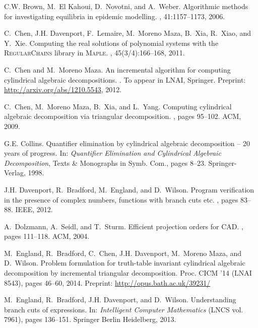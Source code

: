 \documentclass[runningheads,a4paper]{llncs}
\begin{document}
\begin{thebibliography}{99}
C.W. Brown, M.~El Kahoui, D.~Novotni, and A.~Weber.
\newblock Algorithmic methods for investigating equilibria in epidemic
  modelling.
, 41:1157--1173, 2006.

C.~Chen, J.H. Davenport, F.~Lemaire, M.~Moreno Maza, B.~Xia, R.~Xiao, and
  Y.~Xie.
\newblock Computing the real solutions of polynomial systems with the
  \textsc{RegularChains} library in \textsc{Maple}.
, 45(3/4):166--168, 2011.

C.~Chen and M.~Moreno Maza.
\newblock An incremental algorithm for computing cylindrical algebraic
  decompositions.
. To appear in LNAI, Springer. Preprint: \url{http://arxiv.org/abs/1210.5543}, 2012.

C.~Chen, M.~Moreno Maza, B.~Xia, and L.~Yang.
\newblock Computing cylindrical algebraic decomposition via triangular
  decomposition.
, pages 95--102. ACM, 2009.

G.E. Collins.
\newblock Quantifier elimination by cylindrical algebraic decomposition -- 20
  years of progress.
\newblock In: {\em Quantifier Elimination and Cylindrical Algebraic Decomposition}, Texts \& Monographs in Symb.
  Com., pages 8--23. Springer-Verlag, 1998.

J.H. Davenport, R.~Bradford, M.~England, and D.~Wilson.
\newblock Program verification in the presence of complex numbers, functions
  with branch cuts etc.
, pages 83--88. IEEE, 2012.

A.~Dolzmann, A.~Seidl, and T.~Sturm.
\newblock Efficient projection orders for {CAD}.
, pages 111--118. ACM, 2004.

M.~England, R.~Bradford, C.~Chen, J.H. Davenport, M.~Moreno Maza, and
  D.~Wilson.
\newblock Problem formulation for truth-table invariant cylindrical algebraic
  decomposition by incremental triangular decomposition.
 Proc. CICM '14 (LNAI 8543), pages 46--60, 2014.  
Preprint: \url{http://opus.bath.ac.uk/39231/}

M.~England, R.~Bradford, J.H. Davenport, and D.~Wilson.
\newblock Understanding branch cuts of expressions.
\newblock In: {\em Intelligent Computer Mathematics} (LNCS vol. 7961), pages 136--151. Springer Berlin Heidelberg, 2013.


\end{thebibliography}
\end{document}
